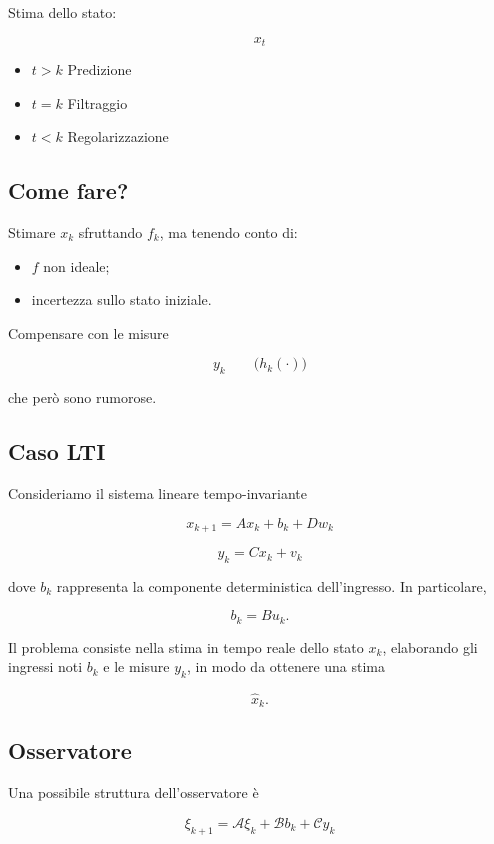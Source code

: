 \documentclass[11pt,a4paper]{article}
\begin{document}
Stima dello stato:

\[
x_t
\]

\begin{itemize}
    \item $t>k$ \hfill Predizione
    \item $t=k$ \hfill Filtraggio
    \item $t<k$ \hfill Regolarizzazione
\end{itemize}

\subsection*{Come fare?}

Stimare $x_k$ sfruttando $f_k$, ma tenendo conto di:

\begin{itemize}
    \item $f$ non ideale;
    \item incertezza sullo stato iniziale.
\end{itemize}

Compensare con le misure

\[
y_k
\qquad \bigl(h_k(\cdot)\bigr)
\]

che però sono rumorose.

\subsection*{Caso LTI}

Consideriamo il sistema lineare tempo-invariante

\[
x_{k+1} = A x_k + b_k + D w_k
\]

\[
y_k = C x_k + v_k
\]

dove $b_k$ rappresenta la componente deterministica dell'ingresso. In particolare,

\[
b_k = B u_k.
\]

Il problema consiste nella stima in tempo reale dello stato $x_k$, elaborando gli ingressi noti $b_k$ e le misure $y_k$, in modo da ottenere una stima

\[
\hat{x}_k.
\]

\subsection*{Osservatore}

Una possibile struttura dell'osservatore è

\[
\xi_{k+1}
=
\mathcal{A}\xi_k
+
\mathcal{B}b_k
+
\mathcal{C}y_k
\]
\end{document}

